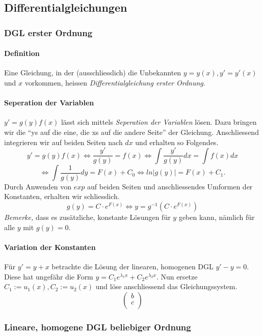 \documentclass[a4paper, 9pt, DIV=24]{scrartcl}
\begin{document}
\subsection{Differentialgleichungen}

\subsubsection{DGL erster Ordnung}
\paragraph{Definition}
Eine Gleichung, in der (ausschliesslich) die Unbekannten $y = y(x), y' = y'(x)$ und $x$ vorkommen, heissen \emph{Differentialgleichung erster Ordnung}.
\paragraph{Seperation der Variablen}
$y' = g(y)f(x)$ lässt sich mittels \emph{Seperation der Variablen} lösen.
Dazu bringen wir die ``ys auf die eine, die xs auf die andere Seite'' der Gleichung.
Anschliessend integrieren wir auf beiden Seiten nach $dx$ und erhalten so Folgendes.
\[ y' = g(y)f(x) \iff \frac{y'}{g(y)} = f(x) \iff \int\frac{y'}{g(y)}dx = \int f(x)dx \]
\[ \iff \int\frac{1}{g(y)}dy = F(x) + C_0 \iff ln |g(y)| = F(x) + C_1. \]
Durch Anwenden von $exp$ auf beiden Seiten und anschliessendes Umformen der Konstanten, erhalten wir schliesslich.
\[ g(y) = C\cdot e^{F(x)} \iff y = g^{-1}(C\cdot e^{F(x)}) \]
\emph{Bemerke,} dass es zusätzliche, konstante Lösungen für $y$ geben kann, nämlich für alle $y$ mit $g(y) = 0$.

\paragraph{Variation der Konstanten}
Für $y' = y + x$ betrachte die Lösung der linearen, homogenen DGL $y' - y = 0$. Diese hat ungefähr die Form $y = C_1 e^{\lambda_1 x} + C_2 e^{\lambda_2 x}$.
Nun ersetze $C_1 := u_1(x), C_2 := u_2(x)$ und löse anschliessend das Gleichungssystem.
\[
\begin{pmatrix}
 b \\ c \\
\end{pmatrix}
\]

\subsubsection{Lineare, homogene DGL beliebiger Ordnung}
\end{document}
